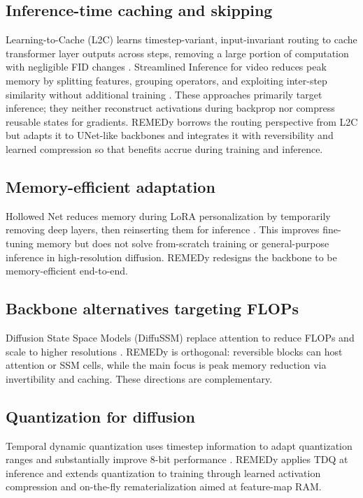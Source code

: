 \documentclass{article}
\begin{document}
\subsection{Inference-time caching and skipping}
Learning-to-Cache (L2C) learns timestep-variant, input-invariant routing to cache transformer layer outputs across steps, removing a large portion of computation with negligible FID changes \cite{ma_2024_learning}. Streamlined Inference for video reduces peak memory by splitting features, grouping operators, and exploiting inter-step similarity without additional training \cite{zhan_2024_fast}. These approaches primarily target inference; they neither reconstruct activations during backprop nor compress reusable states for gradients. REMEDy borrows the routing perspective from L2C but adapts it to UNet-like backbones and integrates it with reversibility and learned compression so that benefits accrue during training and inference.

\subsection{Memory-efficient adaptation}
Hollowed Net reduces memory during LoRA personalization by temporarily removing deep layers, then reinserting them for inference \cite{cho_2024_hollowed}. This improves fine-tuning memory but does not solve from-scratch training or general-purpose inference in high-resolution diffusion. REMEDy redesigns the backbone to be memory-efficient end-to-end.

\subsection{Backbone alternatives targeting FLOPs}
Diffusion State Space Models (DiffuSSM) replace attention to reduce FLOPs and scale to higher resolutions \cite{yan_2023_diffusion}. REMEDy is orthogonal: reversible blocks can host attention or SSM cells, while the main focus is peak memory reduction via invertibility and caching. These directions are complementary.

\subsection{Quantization for diffusion}
Temporal dynamic quantization uses timestep information to adapt quantization ranges and substantially improve 8-bit performance \cite{so_2023_temporal}. REMEDy applies TDQ at inference and extends quantization to training through learned activation compression and on-the-fly rematerialization aimed at feature-map RAM.
\end{document}
